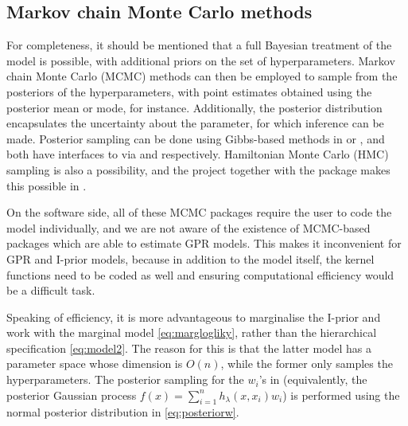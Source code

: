 

\subsection{Markov chain Monte Carlo methods}

For completeness, it should be mentioned that a full Bayesian treatment of the model is possible, with additional priors on the set of hyperparameters.
Markov chain Monte Carlo (MCMC) methods can then be employed to sample from the posteriors of the hyperparameters, with point estimates obtained using the posterior mean or mode, for instance.
Additionally, the posterior distribution encapsulates the uncertainty about the parameter, for which inference can be made.
Posterior sampling can be done using Gibbs-based methods in  \citep{lunn2000winbugs} or  \citep{plummer2003jags}, and both have interfaces to  via  \citep{sturtz2005r2winbugs} and  \citep{denwood2016runjags} respectively.
Hamiltonian Monte Carlo (HMC) sampling is also a possibility, and the  project \citep{carpenter2016stan} together with the package  \citep{rstan}  makes this possible in .

On the software side, all of these MCMC packages require the user to code the model individually, and we are not aware of the existence of MCMC-based packages which are able to estimate GPR models.
This makes it inconvenient for GPR and I-prior models, because in addition to the model itself, the kernel functions need to be coded as well and ensuring computational efficiency would be a difficult task.

Speaking of efficiency, it is more advantageous to marginalise the I-prior and work with the marginal model \eqref{eq:marglogliky}, rather than the hierarchical specification \eqref{eq:model2}.
The reason for this is that the latter model has a parameter space whose dimension is $O(n)$, while the former only samples the hyperparameters.
The posterior sampling for the $w_i$'s in (equivalently, the posterior Gaussian process $f(x) = \sum_{i=1}^n h_\lambda(x,x_i)w_i$) is performed using the normal posterior distribution in \eqref{eq:posteriorw}.

